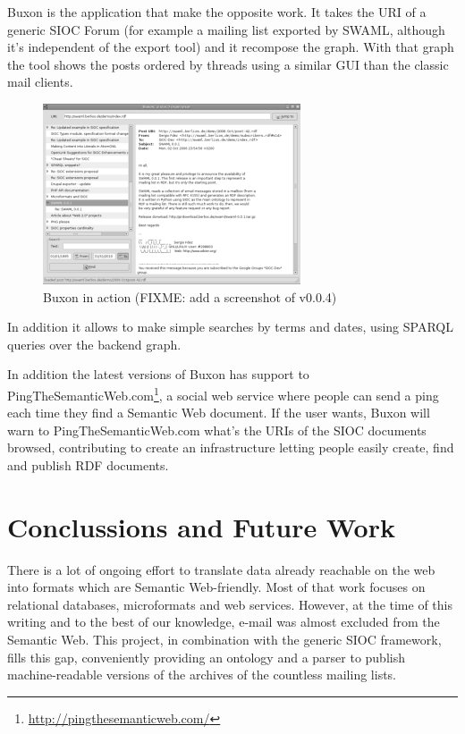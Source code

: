 \documentclass{llncs}
\begin{document}
Buxon is the application that make the opposite work. It takes the URI of a 
generic SIOC Forum (for example a mailing list exported by SWAML, although 
it's independent of the export tool) and it recompose the graph. With that
graph the tool shows the posts ordered by threads using a similar GUI than 
the classic mail clients.

\begin{figure}[ht]
 \centering
 \includegraphics[bb=0 0 288 202]{images/buxon.png}
 \caption{Buxon in action (FIXME: add a screenshot of v0.0.4)}
\end{figure}

In addition it allows to make simple searches by terms and dates, using
SPARQL queries over the backend graph.

In addition the latest versions of Buxon has support to 
PingTheSemanticWeb.com\footnote{\url{http://pingthesemanticweb.com/}}, 
a social web service where people can send a ping each time they find 
a Semantic Web document. If the user wants, Buxon will warn to 
PingTheSemanticWeb.com what's the URIs of the SIOC documents browsed,
contributing to create an infrastructure letting people easily create, 
find and publish RDF documents.

\section{\label{sec:conclussions}Conclussions and Future Work}

There is a lot of ongoing effort to translate data already reachable
on the web into formats which are Semantic Web-friendly. Most of that 
work focuses on relational databases, microformats and web services. 
However, at the time of this writing and to the best of our knowledge, 
e-mail was almost excluded from the Semantic Web. This project, in 
combination with the generic SIOC framework, fills this gap, conveniently 
providing an ontology and a parser to publish machine-readable versions 
of the archives of the countless mailing lists.
\end{document}
